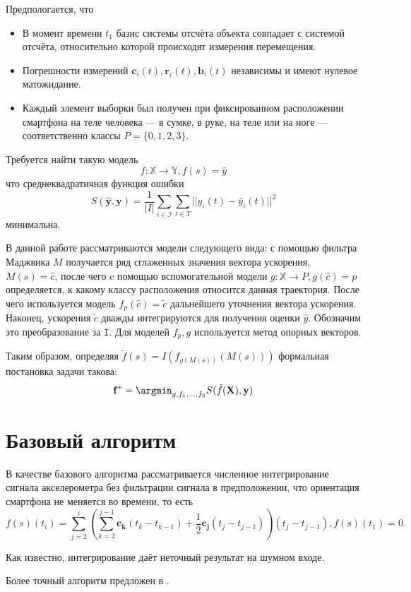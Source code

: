 \documentclass[12pt,twoside]{article}
\begin{document}
Предпологается, что
\begin{itemize}
    \item В момент времени $t_1$ базис системы отсчёта объекта совпадает с системой отсчёта, относительно которой происходят измерения перемещения.
    \item Погрешности измерений $\mathbf{c}_i(t), \mathbf{r}_i(t), \mathbf{b}_i(t)$ независимы и имеют нулевое матожидание.
    \item Каждый элемент выборки был получен при фиксированном расположении смартфона на теле человека --- в сумке, в руке, на теле или на ноге 
    --- соответственно классы $ P = \{0, 1, 2, 3 \} $.
\end{itemize}

Требуется найти такую модель 
$$ 
f: \mathbb{X} \rightarrow \mathbb{Y}, f(s) = \hat{y} 
$$
что среднеквадратичная функция ошибки 
$$
    S(\hat{\mathbf{y}}, \mathbf{y}) = \frac{1}{|I|} \sum\limits_{i \in \mathcal{I}} \sum\limits_{t \in T} || y_i(t) - \hat{y}_i(t) ||^2
$$ 
минимальна.

В данной работе рассматриваются модели следующего вида:
с помощью фильтра Маджвика $M$ получается ряд сглаженных значения вектора ускорения, $M(s) = \hat{c} $, после чего c помощью вспомогательной
модели $g: \mathbb{X} \rightarrow P, g(\hat{c}) = p$ определяется, к какому классу расположения относится данная траектория. После чего
используется модель $f_p(\hat{c}) = \tilde{c} $ дальнейшего уточнения вектора ускорения. Наконец, ускорения $\tilde{c}$ дважды интегрируются для 
получения оценки $\hat{y}$. Обозначим это преобразование за $\mathtt{I}$. Для моделей $f_p, g$ используется метод опорных векторов.

Таким образом, определяя $\tilde{f}(s) = I(f_{g(M(s))}(M(s)))$ формальная постановка задачи такова:
$$
    \mathbf{f}^* = \argmin_{g, f_1, \ldots, f_3 } S(\tilde{f}(\mathbf{X}), \mathbf{y})
$$

\section{Базовый алгоритм}

В качестве базового алгоритма рассматривается численное интегрирование сигнала акселерометра 
без фильтрации сигнала в предположении, что ориентация смартфона не меняется во времени, то есть
$$
    f(s)(t_i) = \sum\limits_{j=2}^{i}(\sum\limits_{k=2}^{j - 1} \mathbf{c_k} (t_k - t_{k - 1}) + \frac{1}{2}\mathbf{c_j} (t_j - t_{j - 1})) (t_j - t_{j - 1}), f(s)(t_1) = 0.
$$

Как известно, интегрирование даёт неточный результат на шумном входе.

Более точный алгоритм предложен в \cite{journals/corr/abs-1712-09004}.



\end{document}
